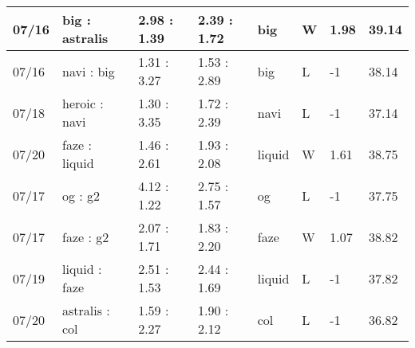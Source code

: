 \begin{small}
\begin{longtable}{|l|l|l|l|l|l|l|l|}
	07/16                               & big : astralis                      & 2.98 : 1.39                             & 2.39 : 1.72                             & big                               & W                                 & 1.98                                 & 39.14                             \\ \hline
	07/16                               & navi : big                          & 1.31 : 3.27                             & 1.53 : 2.89                             & big                               & L                                 & -1                                   & 38.14                             \\ \hline
	07/18                               & heroic : navi                       & 1.30 : 3.35                             & 1.72 : 2.39                             & navi                              & L                                 & -1                                   & 37.14                             \\ \hline
	07/20                               & faze : liquid                       & 1.46 : 2.61                             & 1.93 : 2.08                             & liquid                            & W                                 & 1.61                                 & 38.75                             \\ \hline
	07/17                               & og : g2                             & 4.12 : 1.22                             & 2.75 : 1.57                             & og                                & L                                 & -1                                   & 37.75                             \\ \hline
	07/17                               & faze : g2                           & 2.07 : 1.71                             & 1.83 : 2.20                             & faze                              & W                                 & 1.07                                 & 38.82                             \\ \hline
	07/19                               & liquid : faze                       & 2.51 : 1.53                             & 2.44 : 1.69                             & liquid                            & L                                 & -1                                   & 37.82                             \\ \hline
	07/20                               & astralis : col                      & 1.59 : 2.27                             & 1.90 : 2.12                             & col                               & L                                 & -1                                   & 36.82                             \\ \hline

\end{longtable}
\end{small}
